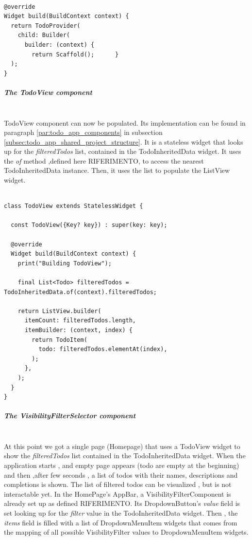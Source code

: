  \mbox{}

\begin{verbatim}

@override
Widget build(BuildContext context) {
  return TodoProvider(
    child: Builder(
      builder: (context) {
        return Scaffold();      }
  );
}
\end{verbatim}

\subparagraph{The TodoView component}\mbox{}\\
\label{subpar:todo_app_inherited_widget_todoview_component}
TodoView component can now be populated. Its implementation can be found in paragraph \ref{par:todo_app_components} in subsection \ref{subsec:todo_app_shared_project_structure}. It is a stateless widget that looks up for the \textit{filteredTodos} list, contained in the TodoInheritedData widget. It uses the \textit{of} method ,defined here RIFERIMENTO, to access the nearest TodoInheritedData instance. Then, it uses the list to populate the ListView widget. 
\mbox{}\\


 \mbox{}

\begin{verbatim}

class TodoView extends StatelessWidget {

  const TodoView({Key? key}) : super(key: key);

  @override
  Widget build(BuildContext context) {
    print("Building TodoView");

    final List<Todo> filteredTodos = TodoInheritedData.of(context).filteredTodos;

    return ListView.builder(
      itemCount: filteredTodos.length,
      itemBuilder: (context, index) {
        return TodoItem(
          todo: filteredTodos.elementAt(index),
        );
      },
    );
  }
}
\end{verbatim}


\subparagraph{The VisibilityFilterSelector component}\mbox{}\\
\label{subpar:todo_app_inherited_widget_visibilityfiltercomponent_component}
At this point we got a single page (Homepage) that uses a TodoView widget to show the \textit{filteredTodos} list contained in the TodoInheritedData widget. When the application starts , and empty page appears (todo are empty at the beginning) and then ,after few seconds , a list of todos with their names, descriptions and completions is shown. The list of filtered todos can be visualized , but is not interactable yet. 
In the HomePage’s AppBar, a VisibilityFilterComponent is already set up as defined RIFERIMENTO. Its DropdownButton’s \textit{value} field is set looking up for the \textit{filter} value in the TodoInheritedData widget. Then , the \textit{items} field is filled with a list of DropdownMenuItem widgets that comes from the mapping of all possible VisibilityFilter values to DropdownMenuItem widgets.
\mbox{}\\


